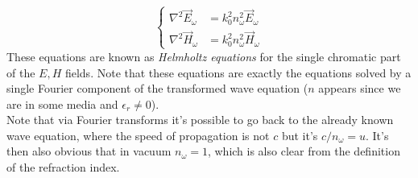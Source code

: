 \documentclass[../electromagnetism.tex]{subfiles}
\begin{document}
\begin{equation}
	\left\{ \begin{aligned}
			\nabla^2\vec{E}_\omega&= k_0^2n_\omega^2\vec{E}_\omega\\
			\nabla^2\vec{H}_\omega&= k_0^2n_\omega^2\vec{H}_\omega
	\end{aligned}\right.
	\label{eq:helmholtz.waves}
\end{equation}
These equations are known as \textit{Helmholtz equations} for the single chromatic part of the $E, H$ fields. Note that these equations are exactly the equations solved by a single Fourier component of the transformed wave equation ($n$ appears since we are in some media and $\epsilon_r\ne0$).\\
Note that via Fourier transforms it's possible to go back to the already known wave equation, where the speed of propagation is not $c$ but it's $c/n_\omega=u$. It's then also obvious that in vacuum $n_\omega=1$, which is also clear from the definition of the refraction index.\\
\end{document}
